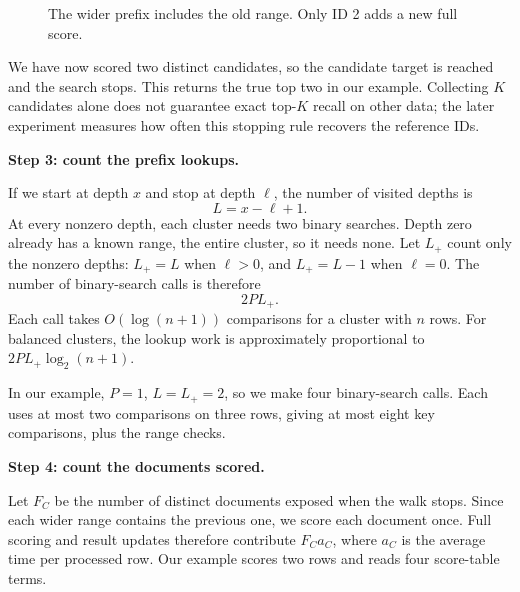 \begin{figure}[htbp]\centering
{}
\caption{The wider prefix includes the old range. Only ID 2 adds a new full score.}
\end{figure}

We have now scored two distinct candidates, so the candidate target is reached and the search stops. This returns the true top two in our example. Collecting $K$ candidates alone does not guarantee exact top-$K$ recall on other data; the later experiment measures how often this stopping rule recovers the reference IDs.

\textbf{Step 3: count the prefix lookups.}\par
If we start at depth $x$ and stop at depth $\ell$, the number of visited depths is
\[
 L=x-\ell+1.
\]
At every nonzero depth, each cluster needs two binary searches. Depth zero already has a known range, the entire cluster, so it needs none. Let $L_+$ count only the nonzero depths: $L_+=L$ when $\ell>0$, and $L_+=L-1$ when $\ell=0$. The number of binary-search calls is therefore
\[
 2PL_+.
\]
Each call takes $O(\log(n+1))$ comparisons for a cluster with $n$ rows. For balanced clusters, the lookup work is approximately proportional to $2PL_+\log_2(n+1)$.

In our example, $P=1$, $L=L_+=2$, so we make four binary-search calls. Each uses at most two comparisons on three rows, giving at most eight key comparisons, plus the range checks.

\textbf{Step 4: count the documents scored.}\par
Let $F_C$ be the number of distinct documents exposed when the walk stops. Since each wider range contains the previous one, we score each document once. Full scoring and result updates therefore contribute $F_Ca_C$, where $a_C$ is the average time per processed row. Our example scores two rows and reads four score-table terms.

